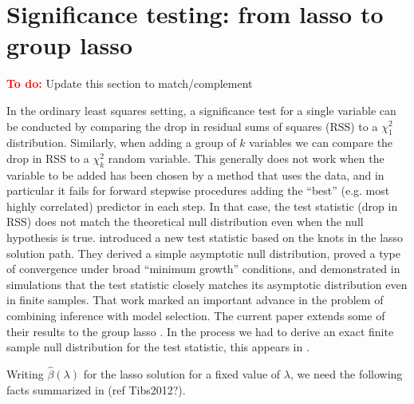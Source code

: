 \documentclass{imsart}
\newcommand{\todo}{\textcolor{red}{\textbf{To do: }}}
\begin{document}

\section{Significance testing: from lasso to group lasso}
\label{sec:testing}

\todo Update this section to match/complement \citep{tests:adaptive}



In the ordinary least squares setting, a significance test for a
single variable can be conducted by comparing the drop in residual
sums of squares (RSS) to a $\chi^2_1$ distribution. Similarly, when
adding a group of $k$ variables we can compare the drop in RSS to a
$\chi^2_k$ random variable. This generally does not work when the
variable to be added has been chosen by a method that uses the data,
and in particular it fails for forward stepwise procedures adding
the ``best'' (e.g. most highly correlated) predictor in each step. In
that case, the test statistic (drop in RSS) does not match the
theoretical null distribution even when the null hypothesis is
true. \cite{significance:lasso} introduced a new test statistic based
on the knots in the lasso solution path. They derived a simple
asymptotic null distribution, proved a type of convergence under broad
``minimum growth'' conditions, and demonstrated in simulations that
the test statistic closely matches its asymptotic distribution even in
finite samples.  That work marked an important advance in the problem
of combining inference with model selection.  The current paper
extends some of their results to the group lasso \citep{grouplasso}.
In the process we had to derive an exact finite sample null
distribution for the test statistic, this appears in
\cite{tests:adaptive}. 


Writing $\hat \beta(\lambda)$ for the lasso solution for a fixed value of $\lambda$, we need
the following facts summarized in \cite{significance:lasso} (ref Tibs2012?).
\end{document}
